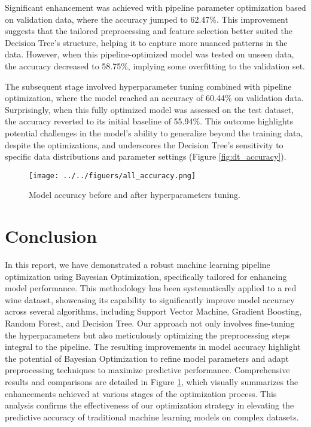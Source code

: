 \documentclass[
	letterpaper, %
	12pt, %
	unnumberedsections, %
	twoside, %
]{LTJournalArticle}
\begin{document}
Significant enhancement was achieved with pipeline parameter optimization based on validation data, where the accuracy jumped to 62.47\%. This improvement suggests that the tailored preprocessing and feature selection better suited the Decision Tree's structure, helping it to capture more nuanced patterns in the data. However, when this pipeline-optimized model was tested on unseen data, the accuracy decreased to 58.75\%, implying some overfitting to the validation set.

The subsequent stage involved hyperparameter tuning combined with pipeline optimization, where the model reached an accuracy of 60.44\% on validation data. Surprisingly, when this fully optimized model was assessed on the test dataset, the accuracy reverted to its initial baseline of 55.94\%. This outcome highlights potential challenges in the model’s ability to generalize beyond the training data, despite the optimizations, and underscores the Decision Tree's sensitivity to specific data distributions and parameter settings (Figure \ref{fig:dt_accuracy}).

\begin{figure}
	\texttt{[image: ../../figuers/all\_accuracy.png]}
	\caption{Model accuracy before and after hyperparameters tuning.}
	\label{fig:all_accuracy}
\end{figure}


\section{Conclusion}
In this report, we have demonstrated a robust machine learning pipeline optimization using Bayesian Optimization, specifically tailored for enhancing model performance. This methodology has been systematically applied to a red wine dataset, showcasing its capability to significantly improve model accuracy across several algorithms, including Support Vector Machine, Gradient Boosting, Random Forest, and Decision Tree. Our approach not only involves fine-tuning the hyperparameters but also meticulously optimizing the preprocessing steps integral to the pipeline. The resulting improvements in model accuracy highlight the potential of Bayesian Optimization to refine model parameters and adapt preprocessing techniques to maximize predictive performance. Comprehensive results and comparisons are detailed in Figure \ref{fig:all_accuracy}, which visually summarizes the enhancements achieved at various stages of the optimization process. This analysis confirms the effectiveness of our optimization strategy in elevating the predictive accuracy of traditional machine learning models on complex datasets.


\printbibliography %

\end{document}

